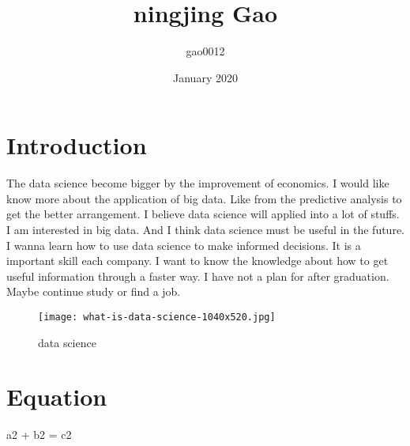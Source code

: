 \documentclass{article}
\title{ningjing Gao}
\author{gao0012 }
\date{January 2020}
\begin{document}
\maketitle

\section{Introduction}
The data science become bigger by the improvement of economics. I would like know more about the application of big data. Like from the predictive analysis to get the better arrangement. I believe data science will applied into a lot of stuffs.
I am interested in big data. And I think data science must be useful in the future.
I wanna learn how to use data science to make informed decisions. It is a important skill each company.
I want to know the knowledge about how to get useful information through a faster way. I have not a plan for after graduation. Maybe continue study or find a job.

\begin{figure}[h!]
\centering

\texttt{[image: what-is-data-science-1040x520.jpg]}
\caption{data science}

\label{fig:data science}
\end{figure}



\section{Equation}
a2 + b2 = c2
\end{document}

